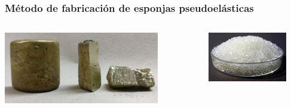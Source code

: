 \documentclass[usenames,dvipsnames]{beamer}
\begin{document}
\begin{frame}
\frametitle{Método de fabricación de esponjas pseudoelásticas}



\begin{columns}
\includegraphics[width=0.8\textwidth]{img/proceso/lingote.jpg}

\includegraphics[width=0.8\textwidth]{img/proceso/silica.jpg}



\end{columns}
\end{frame}
\end{document}
